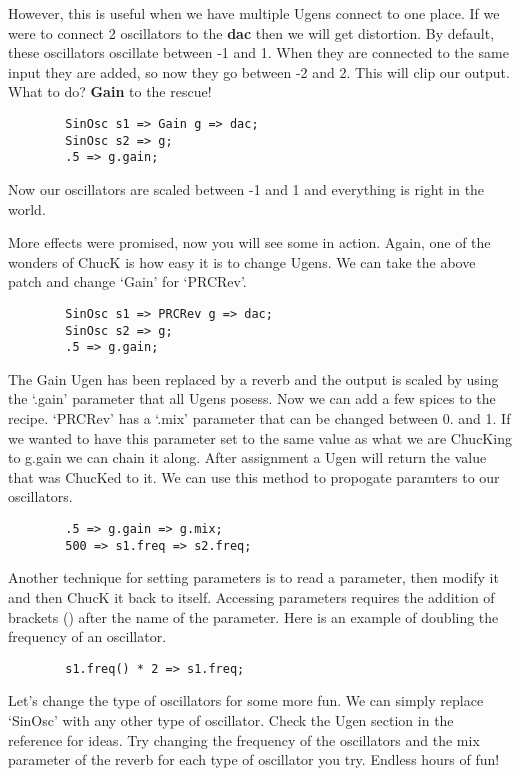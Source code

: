 However, this is useful when we have multiple Ugens connect to one place. If we were to connect 2 oscillators to the {\bf dac} then we will get distortion. By default, these oscillators oscillate between -1 and 1. When they are connected to the same input they are added, so now they go between -2 and 2. This will clip our output. What to do? {\bf Gain} to the rescue!

\begin{verbatim}
        SinOsc s1 => Gain g => dac;
        SinOsc s2 => g;
        .5 => g.gain;
\end{verbatim}

Now our oscillators are scaled between -1 and 1 and everything is right in the world.

More effects were promised, now you will see some in action. Again, one of the wonders of ChucK is how easy it is to change Ugens. We can take the above patch and change `Gain' for `PRCRev'.

\begin{verbatim}
        SinOsc s1 => PRCRev g => dac;
        SinOsc s2 => g;
        .5 => g.gain;
\end{verbatim}

The Gain Ugen has been replaced by a reverb and the output is scaled by using the `.gain' parameter that all Ugens posess. Now we can add a few spices to the recipe. `PRCRev' has a `.mix' parameter that can be changed between 0. and 1. If we wanted to have this parameter set to the same value as what we are ChucKing to g.gain we can chain it along. After assignment a Ugen will return the value that was ChucKed to it. We can use this method to propogate paramters to our oscillators.

\begin{verbatim}
        .5 => g.gain => g.mix;
        500 => s1.freq => s2.freq;
\end{verbatim}

Another technique for setting parameters is to read a parameter, then modify it and then ChucK it back to itself. Accessing parameters requires the addition of brackets () after the name of the parameter. Here is an example of doubling the frequency of an oscillator. 

\begin{verbatim}
        s1.freq() * 2 => s1.freq;
\end{verbatim}

Let's change the type of oscillators for some more fun. We can simply replace `SinOsc' with any other type of oscillator. Check the Ugen section in the reference for ideas. Try changing the frequency of the oscillators and the mix parameter of the reverb for each type of oscillator you try. Endless hours of fun!
